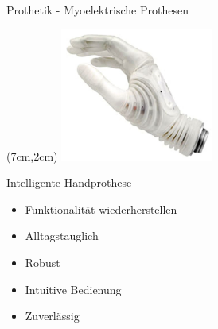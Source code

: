 \documentclass[10pt]{beamer}
\begin{document}
	\begin{frame}{Prothetik - Myoelektrische Prothesen}
		\begin{textblock*}{5cm}(7cm,2cm) %
			\includegraphics[width=5cm]{./pics/michelangelo-hand.jpg}
		\end{textblock*}
		Intelligente Handprothese
		\begin{itemize}
			\item Funktionalität wiederherstellen
			\item Alltagstauglich
			\item Robust
			\item Intuitive Bedienung
			\item Zuverlässig
		\end{itemize}
	\end{frame}
		
\end{document}
